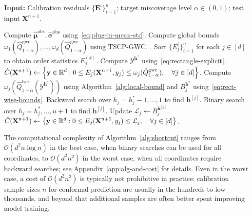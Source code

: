 \begin{algorithm}[!htbp]
\caption{Transductively Standardized Conformal Prediction (TSCP)}
\label{alg:shortcut}
\textbf{Input:} Calibration residuals $\{\mathbf{E}^i\}_{i=1}^{n}$; target miscoverage level $\alpha\in(0,1)$; test input $\mathbf{X}^{n+1}$.
\begin{algorithmic}[1]
\State Compute $\hat{\boldsymbol\mu}^{\mathrm{obs}}, \hat{\boldsymbol\sigma}^{\mathrm{obs}}$ using~\eqref{eq:plug-in-mean-std}.
\State Compute global bounds $\omega_1(\hat{Q}^{\mathrm{gwc}}_{1-\alpha}),\ldots,\omega_d(\hat{Q}^{\mathrm{gwc}}_{1-\alpha})$ using TSCP-GWC. .
\State Sort $\{{E}^i_j\}_{i=1}^n$ for each $j\in[d]$ to obtain order statistics $E^{(k)}_j$. 
\State Compute $\mathcal{Y}^{\mathbf{h}^*}$ using~\eqref{eq:rectangle-explicit}.
    \State \Return $\displaystyle \hat{C}(\mathbf{X}^{n+1}) 
    \gets \left\{\mathbf y \in \mathbb{R}^d: 0\leq E_j(\mathbf{X}^{n+1},y_j) \leq \omega_j(\hat{Q}^{\mathrm{gwc}}_{1-\alpha}), \quad\forall j \in [d]\right\}$.
\Else
        \State Compute $\omega_j(\hat{Q}^{\mathrm{lwc}}_{1-\alpha}(\mathcal{Y}^{\mathbf{h}^*}))$ using Algorithm~\ref{alg:local-bound} and $B^{\mathbf{h}^*}_j$ using~\eqref{eq:rect-wise-bounds}.
            \State Backward search over $h_j = h^*_j-1,\ldots, 1$ to find $\mathbf{h}^{[j]}$.\hfill
        \Else 
            \State Binary search over $h_j = h^*_j,\ldots, n{+}1$ to find $\mathbf{h}^{[j]}$.\hfill
        \EndIf
        \State Update $\mathcal{L}_j \gets B^{\mathbf{h}^{[j]}}_j$.
    \EndFor
    \State \Return $\displaystyle \hat{C}(\mathbf{X}^{n+1}) 
    \gets \left\{\mathbf y \in \mathbb{R}^d: 0\leq E_j(\mathbf{X}^{n+1},y_j) \leq \mathcal{L}_j, \quad\forall j \in [d]\right\}$.
\EndIf
\end{algorithmic}
\end{algorithm}

The computational complexity of Algorithm~\ref{alg:shortcut} ranges from $\mathcal{O}(d^2 n \log n)$ in the best case, when binary searches can be used for all coordinates, to $\mathcal{O}(d^2 n^2)$ in the worst case, when all coordinates require backward searches; see Appendix~\ref{app:alg-and-cost} for details. Even in the worst case, a cost of $\mathcal{O}(d^2 n^2)$ is typically not prohibitive in practice: calibration sample sizes $n$ for conformal prediction are usually in the hundreds to low thousands, and beyond that additional samples are often better spent improving model training.

